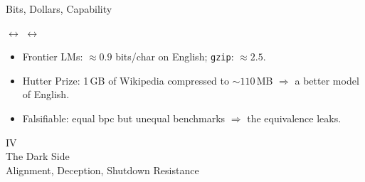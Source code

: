 \documentclass[aspectratio=169, 12pt, xcolor={dvipsnames,table}]{beamer}
\begin{document}
\begin{frame}{Bits, Dollars, Capability}
  \begin{center}
  \hspace{0.4em}\textcolor{anthblue}{\large$\leftrightarrow$}\hspace{0.4em}%
  \hspace{0.4em}\textcolor{anthblue}{\large$\leftrightarrow$}\hspace{0.4em}%
  \end{center}
  \vspace{0.6em}
  \begin{itemize}\setlength{\itemsep}{0.15em}
    \item {\small Frontier LMs: $\approx 0.9$ bits/char on English;
          \texttt{gzip}: $\approx 2.5$.}
    \item {\small Hutter Prize: 1\,GB of Wikipedia compressed to
          ${\sim}110$\,MB $\Rightarrow$ a better model of English.}
    \item {\small \alert{Falsifiable}: equal bpc but unequal benchmarks
          $\Rightarrow$ the equivalence leaks.}
  \end{itemize}
\end{frame}



\begin{frame}[standout]
  \Huge IV\\[12pt]
  \Large The Dark Side\\[4pt]
  \normalsize Alignment, Deception, Shutdown Resistance
\end{frame}
\end{document}
